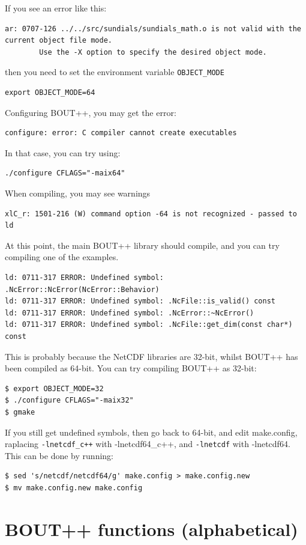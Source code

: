 \documentclass[12pt]{article}
\newcommand{\code}[1]{\texttt{#1}}
\begin{document}
If you see an error like this:
\begin{verbatim}
ar: 0707-126 ../../src/sundials/sundials_math.o is not valid with the current object file mode.
        Use the -X option to specify the desired object mode.
\end{verbatim}
then you need to set the environment variable \code{OBJECT\_MODE}
\begin{verbatim}
export OBJECT_MODE=64
\end{verbatim}

Configuring BOUT++, you may get the error:
\begin{verbatim}
configure: error: C compiler cannot create executables
\end{verbatim}
In that case, you can try using:
\begin{verbatim}
./configure CFLAGS="-maix64"
\end{verbatim}

When compiling, you may see warnings
\begin{verbatim}
xlC_r: 1501-216 (W) command option -64 is not recognized - passed to ld
\end{verbatim}

At this point, the main BOUT++ library should compile, and you can try
compiling one of the examples. 

\begin{verbatim}
ld: 0711-317 ERROR: Undefined symbol: .NcError::NcError(NcError::Behavior)
ld: 0711-317 ERROR: Undefined symbol: .NcFile::is_valid() const
ld: 0711-317 ERROR: Undefined symbol: .NcError::~NcError()
ld: 0711-317 ERROR: Undefined symbol: .NcFile::get_dim(const char*) const
\end{verbatim}

This is probably because the NetCDF libraries are 32-bit, whilst BOUT++ has been compiled as 64-bit. 
You can try compiling BOUT++ as 32-bit:
\begin{verbatim}
$ export OBJECT_MODE=32
$ ./configure CFLAGS="-maix32"
$ gmake
\end{verbatim}
If you still get undefined symbols, then go back to 64-bit, and edit make.config, raplacing
\code{-lnetcdf\_c++} with {-lnetcdf64\_c++}, and \code{-lnetcdf} with {-lnetcdf64}. This 
can be done by running:
\begin{verbatim}
$ sed 's/netcdf/netcdf64/g' make.config > make.config.new
$ mv make.config.new make.config
\end{verbatim}

\section{BOUT++ functions (alphabetical)}
\end{document}
